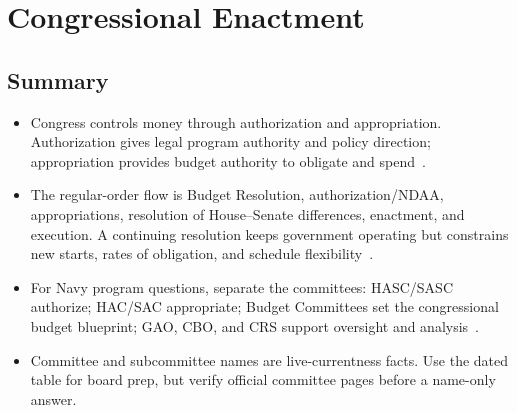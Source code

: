 \documentclass[../main.tex]{subfiles}
\begin{document}
\section{Congressional Enactment}

\subsection{Summary}
\begin{itemize}
  \item Congress controls money through authorization and appropriation. Authorization gives legal program authority and policy direction; appropriation provides budget authority to obligate and spend~\autocite{US-Constitution-Article-I-2026,CRS-R46497-Authorizations-Appropriations}.
  \item The regular-order flow is Budget Resolution, authorization/NDAA, appropriations, resolution of House--Senate differences, enactment, and execution. A continuing resolution keeps government operating but constrains new starts, rates of obligation, and schedule flexibility~\autocite{CRS-R47235-Budget-Process-Timeline,CRS-CR}.
  \item For Navy program questions, separate the committees: HASC/SASC authorize; HAC/SAC appropriate; Budget Committees set the congressional budget blueprint; GAO, CBO, and CRS support oversight and analysis~\autocite{HASC-Subcommittees-2026,SASC-Subcommittee-Leadership-119-2025,HAC-Subcommittees-2026,SAC-Subcommittees-2026,GAO-About-2026,CBO-Introduction-2026,CRS-About-2026}.
  \item Committee and subcommittee names are live-currentness facts. Use the dated table for board prep, but verify official committee pages before a name-only answer.
\end{itemize}
\end{document}

